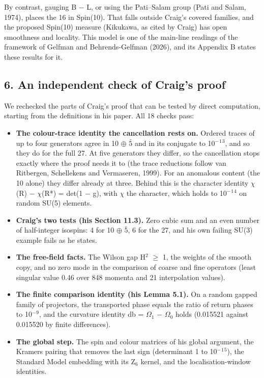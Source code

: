\documentclass[
  11pt,
]{article}
\providecommand{\tightlist}{%
  \setlength{\itemsep}{0pt}\setlength{\parskip}{0pt}}
\begin{document}
By contrast, gauging B \ensuremath{-} L, or using the Pati--Salam group (Pati and Salam, 1974), places the 16 in Spin(10). That falls outside Craig's covered families, and the proposed Spin(10) measure (Kikukawa, as cited by Craig) has open smoothness and locality. This model is one of the main-line readings of the framework of Gelfman and Behrends-Gelfman (2026), and its Appendix B states these results for it.

\hypertarget{an-independent-check-of-craigs-proof}{%
\subsection{6. An independent check of Craig's proof}\label{an-independent-check-of-craigs-proof}}

We rechecked the parts of Craig's proof that can be tested by direct computation, starting from the definitions in his paper. All 18 checks pass:

\begin{itemize}
\tightlist
\item
  \textbf{The colour-trace identity the cancellation rests on.} Ordered traces of up to four generators agree in 10 \ensuremath{\oplus} \ensuremath{\bar{5}} and in its conjugate to 10\ensuremath{^{-}}\ensuremath{^{1}}\ensuremath{^{3}}, and so they do for the full 27. At five generators they differ, so the cancellation stops exactly where the proof needs it to (the trace reductions follow van Ritbergen, Schellekens and Vermaseren, 1999). For an anomalous content (the 10 alone) they differ already at three. Behind this is the character identity \ensuremath{\chi}(R) \ensuremath{-} \ensuremath{\chi}(R*) = det(1 \ensuremath{-} g), with \ensuremath{\chi} the character, which holds to 10\ensuremath{^{-}}\ensuremath{^{1}}\ensuremath{^{4}} on random SU(5) elements.
\item
  \textbf{Craig's two tests (his Section 11.3).} Zero cubic sum and an even number of half-integer isospins: 4 for 10 \ensuremath{\oplus} \ensuremath{\bar{5}}, 6 for the 27, and his own failing SU(3) example fails as he states.
\item
  \textbf{The free-field facts.} The Wilson gap H\ensuremath{^{2}} \ensuremath{\ge} 1, the weights of the smooth copy, and no zero mode in the comparison of coarse and fine operators (least singular value 0.46 over 848 momenta and 21 interpolation values).
\item
  \textbf{The finite comparison identity (his Lemma 5.1).} On a random gapped family of projectors, the transported phase equals the ratio of return phases to 10\ensuremath{^{-}}\ensuremath{^{9}}, and the curvature identity db = \ensuremath{\Omega}\ensuremath{_{1}} \ensuremath{-} \ensuremath{\Omega}\ensuremath{_{0}} holds (0.015521 against 0.015520 by finite differences).
\item
  \textbf{The global step.} The spin and colour matrices of his global argument, the Kramers pairing that removes the last sign (determinant 1 to 10\ensuremath{^{-}}\ensuremath{^{1}}\ensuremath{^{5}}), the Standard Model embedding with its Z\ensuremath{_{6}} kernel, and the localisation-window identities.
\end{itemize}
\end{document}
